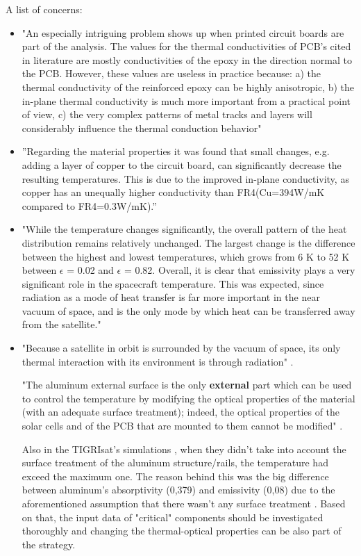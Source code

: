 \documentclass[final]{cubedoc}
\begin{document}
	A list of concerns:
	
	\begin{itemize}
		\item "An especially intriguing problem shows up when printed circuit boards are part of the analysis. The values for the thermal conductivities of PCB’s cited in literature are mostly conductivities of the epoxy in the direction normal to the PCB. However, these values are useless in practice because: a) the thermal conductivity of the reinforced epoxy can be highly anisotropic, b) the in-plane thermal conductivity is much more important from a practical point of view, c) the very complex patterns of metal tracks and layers will considerably influence the thermal conduction behavior" \cite{lasance2002}
		\item ”Regarding the material properties it was found that small changes, e.g.  adding a layer of copper to the circuit board, can significantly decrease the resulting temperatures.  This is due to the improved in-plane conductivity, as copper has an unequally higher conductivity than FR4(Cu=394W/mK compared to FR4=0.3W/mK).” \cite{reiss2012} 
		\item "While the temperature changes significantly, the overall pattern of the heat distribution remains relatively unchanged. The largest change is the difference between the highest and lowest temperatures, which grows from 6 K to 52 K between $\epsilon$ = 0.02 and $\epsilon$ = 0.82. Overall, it is clear that emissivity plays a very significant role in the spacecraft temperature. This was expected, since radiation as a mode of heat transfer is far more important in the near vacuum of space, and is the only mode by which heat can be transferred away from the satellite." \cite{peake2014cubesat}
		\item "Because a satellite in orbit is surrounded by the vacuum of space, its only
		thermal interaction with its environment is through radiation" \cite{vanoutryve2008}.
		
		"The aluminum external surface is the only \textbf{external} part which can be used to control the temperature by modifying the optical properties of the material (with an adequate surface treatment); indeed, the optical properties of the solar cells and of the PCB that are mounted to them cannot be modified" \cite{paris2015}.
		
		Also in the TIGRIsat's simulations , when they didn't take into account the surface treatment of the aluminum structure/rails, the temperature had exceed the maximum one. The reason behind this was the big difference between aluminum's absorptivity (0,379) and emissivity (0,08) due to the aforementioned assumption that there wasn't any surface treatment \cite{paris2015}. Based on that, the input data of "critical" components should be investigated thoroughly and changing the thermal-optical properties can be also part of the strategy.
	\end{itemize}
	
\end{document}
